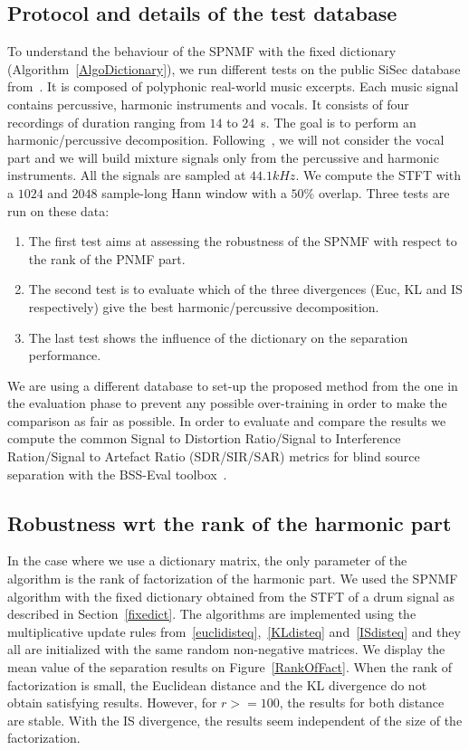 \subsection{Protocol and details of the test database}


To understand the behaviour of the SPNMF with the fixed dictionary (Algorithm~\ref{AlgoDictionary}), we run different tests on the public SiSec database from~\cite{SiSec10}. It is composed of polyphonic real-world music excerpts. Each music signal contains percussive, harmonic instruments and vocals. It consists of four recordings of duration ranging from $14$ to $24$~s. The goal is to perform an harmonic/percussive decomposition. Following~\cite{canadas2014percussive}, we will not consider the vocal part and we will build mixture signals only from the percussive and harmonic instruments. All the signals are sampled at $44.1kHz$. We compute the STFT with a $1024$ and $2048$ sample-long Hann window with a $50\%$ overlap.
Three tests are run on these data:
\begin{enumerate}
	\item The first test aims at assessing the robustness of the SPNMF with respect to the rank of the PNMF part. 
	\item The second test is to evaluate which of the three divergences (Euc, KL and IS respectively) give the best harmonic/percussive decomposition.
	\item The last test shows the influence of the dictionary on the separation performance. 
\end{enumerate} 
We are using a different database to set-up the proposed method from the one in the evaluation phase to prevent any possible over-training in order to make the comparison as fair as possible. 
In order to evaluate and compare the results we compute the common Signal to Distortion Ratio/Signal to Interference Ration/Signal to Artefact Ratio (SDR/SIR/SAR) metrics for blind source separation with the BSS-Eval toolbox~\cite{bsseval}. 


\subsection{Robustness wrt the rank of the harmonic part}
\label{setup:rank}

In the case where we use a dictionary matrix, the only parameter of the algorithm is the rank of factorization of the harmonic part. We used the SPNMF algorithm with the fixed dictionary obtained from the STFT of a drum signal as described in Section~\ref{fixedict}. The algorithms are implemented using the multiplicative update rules from~\ref{euclidisteq},~\ref{KLdisteq} and~\ref{ISdisteq} and they all are  initialized with the same random non-negative matrices. 
We display the mean value of the separation results on Figure~\ref{RankOfFact}. When the rank of factorization is small, the Euclidean distance and the KL divergence do not obtain satisfying results. However, for $r>=100$, the results for both distance are stable. With the IS divergence, the results seem independent of the size of the factorization.

